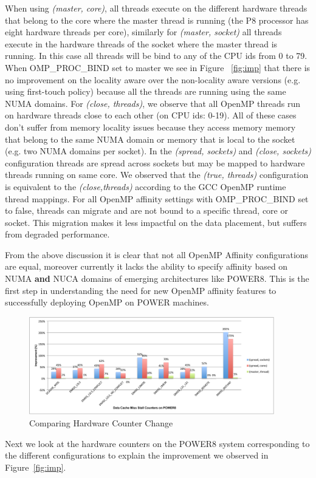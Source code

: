 When using \textit{(master, core)}, all threads execute on the different hardware threads that belong to the core where the master thread is running (the P8 processor has eight hardware threads per core), similarly for \textit{(master, socket)} all threads execute in the hardware threads of the socket where the master thread is running. In this case all threads will be bind to any of the CPU ids from 0 to 79. When OMP\_PROC\_BIND set to master we see in Figure ~\ref{fig:imp} that there is no improvement on the locality aware over the non-locality aware versions (e.g. using first-touch policy) because all the threads are running using the 
same NUMA domains. For \textit{(close, threads)}, we observe that all OpenMP threads run on hardware threads close to each other (on CPU ids: 0-19). 
All of these cases don't suffer from memory locality issues because they access memory memory that belong to the same NUMA domain or memory that is local to the socket (e.g. two NUMA domains per socket).
In the \textit{(spread, sockets)} and \textit{(close, sockets)} configuration threads are spread across sockets but may be mapped to hardware threads running on same core. We observed that the \textit{(true, threads)} configuration is equivalent to the \textit{(close,threads)} according to the GCC OpenMP runtime thread mappings.
For all OpenMP affinity settings  with OMP\_PROC\_BIND set to false, threads can migrate and are not bound to a specific thread, core or socket. This migration makes it less impactful on the data placement, but suffers from degraded performance.

From the above discussion it is clear that not all OpenMP Affinity configurations are equal, moreover currently it lacks the ability to specify affinity based on NUMA \textbf{and} NUCA domains of emerging architectures like POWER8. This is the first step in understanding the need for new OpenMP affinity features to successfully deploying OpenMP on POWER machines. %
\begin{figure}[h!]
  \centering
  \includegraphics[height=0.4\textwidth, width=0.95\textwidth]{./Images/HW.pdf}
       \caption{Comparing Hardware Counter Change}
       \label{fig:HW}
\end{figure}
%
Next we look at the hardware counters on the POWER8 system corresponding to the different configurations to explain the improvement we observed in Figure~\ref{fig:imp}.

